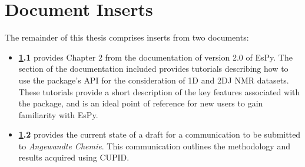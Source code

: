 \chapter{Document Inserts}
\label{chap:inserts}
The remainder of this thesis comprises inserts from two documents:
\begin{itemize}
    \item \textbf{\ref{chap:inserts}.1} provides Chapter 2 from the
        documentation of version 2.0 of \acs{EsPy}. The section of the
        documentation included provides tutorials describing how to use the
        package's \ac{API} for the consideration of \ac{1D} and \ac{2DJ}
        \ac{NMR} datasets. These tutorials provide a short description of the
        key features associated with the package, and is an ideal
        point of reference for new users to gain familiarity with \ac{EsPy}.
    \item \textbf{\ref{chap:inserts}.2} provides the current state of a draft
        for a communication to be submitted to \textit{Angewandte Chemie}. This
        communication outlines the methodology and results acquired using
        \ac{CUPID}.
\end{itemize}


{}
{}


{}
{}


\cleardoublepage
{}
{}
\label{sec:cupid-draft}

